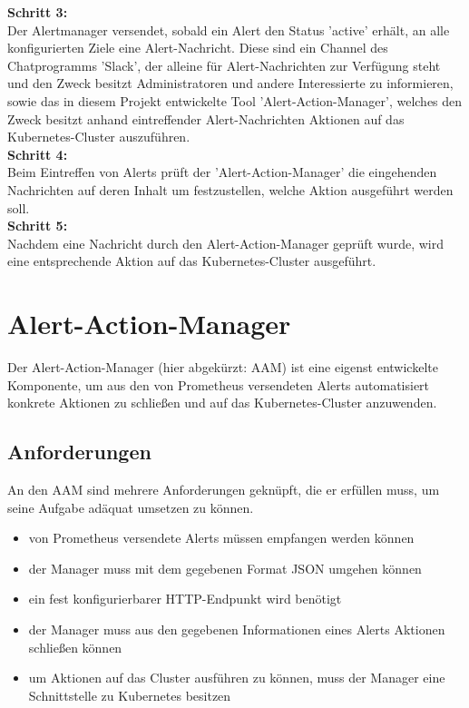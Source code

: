 \documentclass[a4paper,10pt]{scrartcl}
\begin{document}
\textbf{Schritt 3:}\\
Der Alertmanager versendet, sobald ein Alert den Status 'active' erhält,
an alle konfigurierten Ziele eine Alert-Nachricht.
Diese sind ein Channel des Chatprogramms 'Slack',
der alleine für Alert-Nachrichten zur Verfügung steht und den Zweck
 besitzt Administratoren und andere Interessierte zu informieren,
sowie das in diesem Projekt entwickelte Tool 'Alert-Action-Manager',
welches den Zweck besitzt anhand eintreffender Alert-Nachrichten
 Aktionen auf das Kubernetes-Cluster auszuführen.\\
 
\textbf{Schritt 4:}\\
Beim Eintreffen von Alerts prüft der 'Alert-Action-Manager'
die eingehenden Nachrichten auf deren Inhalt
um festzustellen, welche Aktion ausgeführt werden soll.\\

\textbf{Schritt 5:}\\
Nachdem eine Nachricht durch den Alert-Action-Manager geprüft wurde,
wird eine entsprechende Aktion auf das Kubernetes-Cluster ausgeführt.\\

\section{Alert-Action-Manager}

Der Alert-Action-Manager (hier abgekürzt: AAM) ist eine eigenst entwickelte Komponente, um aus den von Prometheus versendeten Alerts automatisiert konkrete Aktionen zu schließen und auf das Kubernetes-Cluster anzuwenden.\\


\subsection{Anforderungen}

An den AAM sind mehrere Anforderungen geknüpft, die er erfüllen muss, um seine Aufgabe adäquat umsetzen zu können.

\begin{itemize}
\item von Prometheus versendete Alerts müssen empfangen werden können
\item der Manager muss mit dem gegebenen Format JSON umgehen können
\item ein fest konfigurierbarer HTTP-Endpunkt wird benötigt
\item der Manager muss  aus den gegebenen Informationen eines Alerts Aktionen schließen können
\item um Aktionen auf das Cluster ausführen zu können, muss der Manager eine Schnittstelle zu Kubernetes besitzen
\end{itemize}
\end{document}
